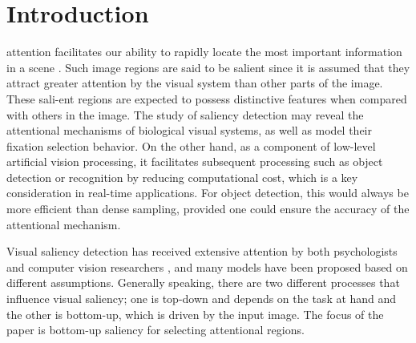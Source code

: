 \documentclass[10pt,journal,cspaper,compsoc]{IEEEtran}
\begin{document}
\maketitle
\IEEEdisplaynotcompsoctitleabstractindextext

\IEEEpeerreviewmaketitle

\section{Introduction}
\label{Intro}

 attention facilitates our ability to rapidly locate the most important information in a scene \cite{ Yarbus1967eye,neisser1967cognitive}. Such image regions are said to be salient since it is assumed that they attract greater attention by the visual system than other parts of the image. These sali-ent regions are expected to possess distinctive features when compared with others in the image. The study of saliency detection may reveal the attentional mechanisms of biological visual systems, as well as model their fixation selection behavior. On the other hand, as a component of low-level artificial vision processing, it facilitates subsequent processing such as object detection or recognition by reducing computational cost, which is a key consideration in real-time applications. For object detection, this would always be more efficient than dense sampling, provided one could ensure the accuracy of the attentional mechanism.

Visual saliency detection has received extensive attention by both psychologists and computer vision researchers \cite{Itti_etal98pami, Itti_Koch01nrn, tsotsos2008roles, NIPS2005_81, saliencypoggio, NIPS2006_897, le2006coherent,kienzle2007nonparametric, mahadevan2009spatiotemporal, NIPS2007_874, NIPS2007_1074, tsotsos2011computational, NIPS2008_0142, ittisurprise}, and many models have been proposed based on different assumptions. Generally speaking, there are two different processes that influence visual saliency; one is top-down and depends on the task at hand and the other is bottom-up, which is driven by the input image. The focus of the paper is bottom-up saliency for selecting attentional regions.
\end{document}
